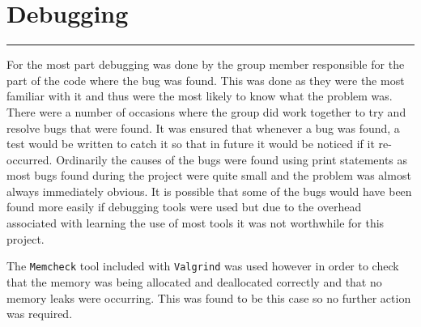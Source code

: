 \section{Debugging}
\vspace{-2em}\rule{\textwidth}{1pt}\vspace{1em}

For the most part debugging was done by the group member responsible for the part of the code where the bug was found.
This was done as they were the most familiar with it and thus were the most likely to know what the problem was.
There were a number of occasions where the group did work together to try and resolve bugs that were found.
It was ensured that whenever a bug was found, a test would be written to catch it so that in future it would be noticed if it re-occurred.
Ordinarily the causes of the bugs were found using print statements as most bugs found during the project were quite small and the problem was almost always immediately obvious.
It is possible that some of the bugs would have been found more easily if debugging tools were used but due to the overhead associated with learning the use of most tools it was not worthwhile for this project.

The \texttt{Memcheck} tool included with \texttt{Valgrind} was used however in order to check that the memory was being allocated and deallocated correctly and that no memory leaks were occurring.
This was found to be this case so no further action was required.
